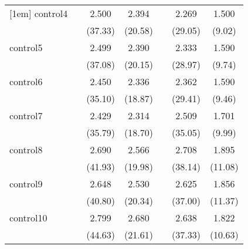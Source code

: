 {\begin{tabular}{l*{6}{c}}
[1em]
control4    &                     &       2.500\sym{***}&       2.394\sym{***}&                     &       2.269\sym{***}&       1.500\sym{***}\\
            &                     &     (37.33)         &     (20.58)         &                     &     (29.05)         &      (9.02)         \\
[1em]
control5    &                     &       2.499\sym{***}&       2.390\sym{***}&                     &       2.333\sym{***}&       1.590\sym{***}\\
            &                     &     (37.08)         &     (20.15)         &                     &     (28.97)         &      (9.74)         \\
[1em]
control6    &                     &       2.450\sym{***}&       2.336\sym{***}&                     &       2.362\sym{***}&       1.590\sym{***}\\
            &                     &     (35.10)         &     (18.87)         &                     &     (29.41)         &      (9.46)         \\
[1em]
control7    &                     &       2.429\sym{***}&       2.314\sym{***}&                     &       2.509\sym{***}&       1.701\sym{***}\\
            &                     &     (35.79)         &     (18.70)         &                     &     (35.05)         &      (9.99)         \\
[1em]
control8    &                     &       2.690\sym{***}&       2.566\sym{***}&                     &       2.708\sym{***}&       1.895\sym{***}\\
            &                     &     (41.93)         &     (19.98)         &                     &     (38.14)         &     (11.08)         \\
[1em]
control9    &                     &       2.648\sym{***}&       2.530\sym{***}&                     &       2.625\sym{***}&       1.856\sym{***}\\
            &                     &     (40.80)         &     (20.34)         &                     &     (37.00)         &     (11.37)         \\
[1em]
control10   &                     &       2.799\sym{***}&       2.680\sym{***}&                     &       2.638\sym{***}&       1.822\sym{***}\\
            &                     &     (44.63)         &     (21.61)         &                     &     (37.33)         &     (10.63)         \\

\end{tabular}}
